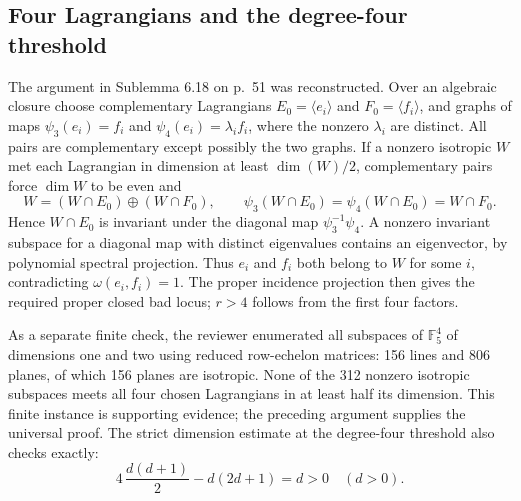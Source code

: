 \documentclass[10pt]{article}
\begin{document}
\subsection*{Four Lagrangians and the degree-four threshold}
The argument in Sublemma 6.18 on p. 51 was reconstructed. Over an algebraic closure choose complementary Lagrangians \(E_0=\langle e_i\rangle\) and \(F_0=\langle f_i\rangle\), and graphs of maps \(\psi_3(e_i)=f_i\) and \(\psi_4(e_i)=\lambda_i f_i\), where the nonzero \(\lambda_i\) are distinct. All pairs are complementary except possibly the two graphs. If a nonzero isotropic \(W\) met each Lagrangian in dimension at least \(\dim(W)/2\), complementary pairs force \(\dim W\) to be even and \[W=(W\cap E_0)\oplus(W\cap F_0),\qquad
\psi_3(W\cap E_0)=\psi_4(W\cap E_0)=W\cap F_0.\] Hence \(W\cap E_0\) is invariant under the diagonal map \(\psi_3^{-1}\psi_4\). A nonzero invariant subspace for a diagonal map with distinct eigenvalues contains an eigenvector, by polynomial spectral projection. Thus \(e_i\) and \(f_i\) both belong to \(W\) for some \(i\), contradicting \(\omega(e_i,f_i)=1\). The proper incidence projection then gives the required proper closed bad locus; \(r>4\) follows from the first four factors.\par
As a separate finite check, the reviewer enumerated all subspaces of \(\mathbb F_5^4\) of dimensions one and two using reduced row-echelon matrices: 156 lines and 806 planes, of which 156 planes are isotropic. None of the 312 nonzero isotropic subspaces meets all four chosen Lagrangians in at least half its dimension. This finite instance is supporting evidence; the preceding argument supplies the universal proof. The strict dimension estimate at the degree-four threshold also checks exactly: \[4\,\frac{d(d+1)}2-d(2d+1)=d>0\quad(d>0).\]\par
\end{document}
